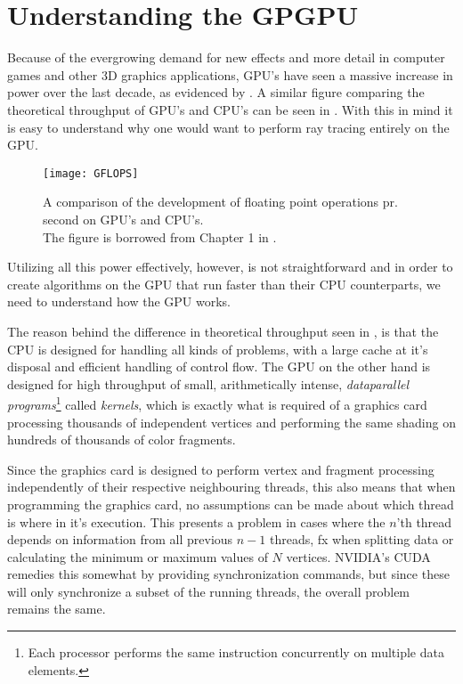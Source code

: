 \chapter{Understanding the GPGPU}\label{chp:GPGPU}





Because of the evergrowing demand for new effects and more detail in
computer games and other 3D graphics applications, GPU's have seen a
massive increase in power over the last decade, as evidenced by
. A similar figure comparing the theoretical
throughput of GPU's and CPU's can be seen in . With
this in mind it is easy to understand why one would want to perform
ray tracing entirely on the GPU.

\begin{figure}
  \centering
  \texttt{[image: GFLOPS]}
  \caption{A comparison of the development of floating point
    operations pr. second on GPU's and CPU's. \\The figure is borrowed
    from Chapter 1 in .}
  \label{fig:gflops}
\end{figure}


Utilizing all this power effectively, however, is not straightforward
and in order to create algorithms on the GPU that run faster than their
CPU counterparts, we need to understand how the GPU works.

The reason behind the difference in theoretical throughput seen in
, is that the CPU is designed for handling all
kinds of problems, with a large cache at it's disposal and efficient
handling of control flow. The GPU on the other hand is designed for
high throughput of small, arithmetically intense, \textit{dataparallel
  programs}\footnote{Each processor performs the same instruction
  concurrently on multiple data elements.} called \textit{kernels},
which is exactly what is required of a graphics card processing
thousands of independent vertices and performing the same shading on
hundreds of thousands of color fragments.

Since the graphics card is designed to perform vertex and fragment
processing independently of their respective neighbouring threads,
this also means that when programming the graphics card, no
assumptions can be made about which thread is where in it's
execution. This presents a problem in cases where the $n$'th thread
depends on information from all previous $n-1$ threads, fx when
splitting data or calculating the minimum or maximum values of $N$
vertices. NVIDIA's CUDA remedies this somewhat by providing
synchronization commands, but since these will only synchronize a
subset of the running threads, the overall problem remains the same.

